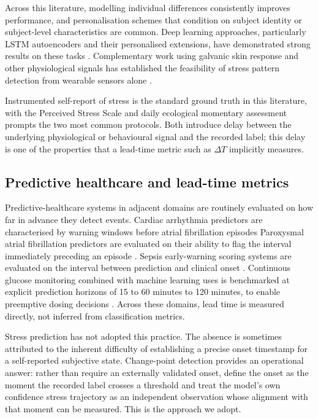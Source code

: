 \documentclass[preprint,12pt,authoryear]{elsarticle}
\newcommand{\dt}{$\Delta T$}
\providecommand{\DIFaddtex}[1]{{\protect\color{blue} \sf #1}} %
\providecommand{\DIFdeltex}[1]{{\protect\color{red} \scriptsize #1}} %
\providecommand{\DIFaddbegin}{} %
\providecommand{\DIFaddend}{} %
\providecommand{\DIFdelbegin}{} %
\providecommand{\DIFdelend}{} %
\providecommand{\DIFadd}[1]{\texorpdfstring{\DIFaddtex{#1}}{#1}} %
\providecommand{\DIFdel}[1]{\texorpdfstring{\DIFdeltex{#1}}{}} %
\newcommand{\DIFscaledelfig}{0.5}
\newlength{\DIFdelgraphicswidth} %
\newlength{\DIFdelgraphicsheight} %
\newcommand{\DIFaddincludegraphics}[2][]{{\color{blue}\fbox{\DIFOincludegraphics[#1]{#2}}}} %
\newcommand{\DIFdelincludegraphics}[2][]{%
\sbox{\DIFdelgraphicsbox}{\DIFOincludegraphics[#1]{#2}}%
\settoboxwidth{\DIFdelgraphicswidth}{\DIFdelgraphicsbox} %
\settoboxtotalheight{\DIFdelgraphicsheight}{\DIFdelgraphicsbox} %
\scalebox{\DIFscaledelfig}{%
\parbox[b]{\DIFdelgraphicswidth}{\usebox{\DIFdelgraphicsbox}\\[-\baselineskip] \rule{\DIFdelgraphicswidth}{0em}}\llap{\resizebox{\DIFdelgraphicswidth}{\DIFdelgraphicsheight}{%
\setlength{\unitlength}{\DIFdelgraphicswidth}%
\begin{picture}(1,1)%
\thicklines\linethickness{2pt} %
{\color[rgb]{1,0,0}\put(0,0){\framebox(1,1){}}}%
{\color[rgb]{1,0,0}\put(0,0){\line( 1,1){1}}}%
{\color[rgb]{1,0,0}\put(0,1){\line(1,-1){1}}}%
\end{picture}%
}\hspace*{3pt}}} %
} %
\DeclareRobustCommand{\DIFaddbegin}{\DIFOaddbegin \let\includegraphics\DIFaddincludegraphics} %
\DeclareRobustCommand{\DIFaddend}{\DIFOaddend \let\includegraphics\DIFOincludegraphics} %
\DeclareRobustCommand{\DIFdelbegin}{\DIFOdelbegin \let\includegraphics\DIFdelincludegraphics} %
\DeclareRobustCommand{\DIFdelend}{\DIFOaddend \let\includegraphics\DIFOincludegraphics} %
\begin{document}
Across this literature, modelling individual differences consistently
improves performance, and personalisation schemes that condition on
subject identity or subject-level characteristics are common. Deep
learning approaches, particularly LSTM autoencoders and their
personalised extensions, have demonstrated strong results on these
tasks \citep{iflrepo,hovsepian2015,taylor2020}. Complementary work
using galvanic skin response and other physiological signals has
established the feasibility of stress pattern detection from wearable
sensors alone \citep{bakker2011,gjoreski2016}.

Instrumented self-report of stress is the standard ground truth in this
literature, with the Perceived Stress Scale
\citep{cohen1983} and daily ecological momentary assessment prompts the
two most common protocols. Both introduce delay between the underlying
physiological or behavioural signal and the recorded label; this delay
is one of the properties that a lead-time metric such as \dt{}
implicitly measures.

\subsection{Predictive healthcare and lead-time metrics}

Predictive-healthcare systems in adjacent domains are routinely
evaluated on how far in advance they detect events. \DIFdelbegin \DIFdel{Cardiac arrhythmia
predictors are characterised by warning windows before atrial fibrillation
episodes \citep{islam2020}}\DIFdelend \DIFaddbegin \DIFadd{Paroxysmal atrial fibrillation
predictors are evaluated on their ability to flag the interval
immediately preceding an episode \citep{ebrahimzadeh2018}}\DIFaddend . Sepsis early-warning scoring
systems are evaluated on the interval between prediction and clinical
onset \citep{henry2015,goldstein2017}. Continuous glucose monitoring
combined with machine learning \DIFdelbegin \DIFdel{uses }\DIFdelend \DIFaddbegin \DIFadd{is benchmarked at explicit }\DIFaddend prediction
horizons of \DIFdelbegin \DIFdel{15 to 60
minutes}\DIFdelend \DIFaddbegin \DIFadd{30 to 120 minutes, }\DIFaddend to enable preemptive dosing
decisions \DIFaddbegin \DIFadd{\citep{debois2022}}\DIFaddend . Across these domains,
lead time is measured directly, not inferred from classification
metrics.

Stress prediction has not adopted this practice. The absence is
sometimes attributed to the inherent difficulty of establishing a
precise onset timestamp for a self-reported subjective state.
Change-point detection provides an operational answer: rather than
require an externally validated onset, define the onset as the moment
the recorded label crosses a threshold and treat the model's own
\DIFdelbegin \DIFdel{confidence }\DIFdelend \DIFaddbegin \DIFadd{stress }\DIFaddend trajectory as an independent observation whose alignment
with that moment can be measured. This is the approach we adopt.
\end{document}
